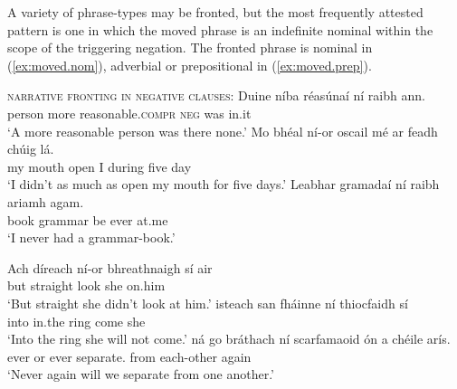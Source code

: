 \documentclass[output=paper,colorlinks,citecolor=brown]{langscibook}
\begin{document}
A variety of phrase-types may be fronted, but the most frequently attested pattern is one in which the moved phrase is an indefinite nominal within the scope of the triggering negation.  The fronted phrase is nominal in (\ref{ex:moved.nom}), adverbial or prepositional in (\ref{ex:moved.prep}).

\ea\label{ex:moved.nom}
\textsc{narrative fronting in negative clauses}:
\ea
\gll Duine níba réasúnaí ní raibh ann. \\
     person more {reasonable.{\scshape compr}} {\scshape neg} was in.it \\
\glt `A more reasonable person was there none.'
\ex
\gll Mo bhéal ní-or oscail mé {ar feadh} chúig lá. \\
     my mouth {\nior} {open\past} I during five day \\
\glt `I didn't as much as open my mouth for five days.'
\ex
\gll Leabhar gramadaí ní raibh ariamh agam. \\
     book {grammar\gen} {\nior} {be\past} ever {at.me} \\
\glt `I never had a grammar-book.'
\z
\z

    
\ea\label{ex:moved.prep}
\ea
\gll Ach díreach ní-or bhreathnaigh sí air \\  %
     but straight {\nior} {look\past} she on.him \\  %
\glt `But straight she didn't look at him.'
\ex
\gll isteach san fháinne ní thiocfaidh sí \\  
     into   {in.the} ring {\no} {come\fut} she \\
\glt `Into the ring she will not come.' 
\ex
{} ná {go bráthach} ní scarfamaoid ón {a chéile} arís. \\
     ever or ever {\no} {separate\fut.\our}  from each-other again \\
\glt `Never again will we separate from one another.'
\z
\z
\end{document}
